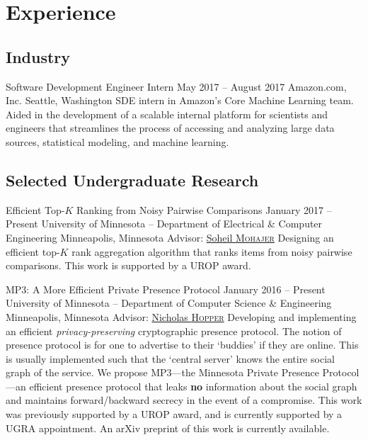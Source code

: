 \section{Experience}
\subsection{Industry}
\block
  {Software Development Engineer Intern}
  {May 2017 -- August 2017}
  {Amazon.com, Inc.}
  {Seattle, Washington}
  {}
  {
    SDE intern in Amazon's Core Machine Learning team. Aided in the development
    of a scalable internal platform for scientists and engineers that
    streamlines the process of accessing and analyzing large data sources,
    statistical modeling, and machine learning.
  }

\subsection{Selected Undergraduate Research}
\block
  {Efficient Top-\boldmath$K$ Ranking from Noisy Pairwise Comparisons}
  {January 2017 -- Present}
  {University of Minnesota -- Department of Electrical \& Computer Engineering}
  {Minneapolis, Minnesota}
  {Advisor: \href{\soheil}{Soheil \textsc{Mohajer}}}
  {
    Designing an efficient top-$K$ rank aggregation algorithm that ranks items
    from noisy pairwise comparisons.  This work is supported by a UROP award.
  }

\block
  {MP3: A More Efficient Private Presence Protocol}
  {January 2016 -- Present}
  {University of Minnesota -- Department of Computer Science \& Engineering}
  {Minneapolis, Minnesota}
  {Advisor: \href{\hoppernj}{Nicholas \textsc{Hopper}}}
  {
    Developing and implementing an efficient \emph{privacy-preserving}
    cryptographic presence protocol. The notion of presence protocol is for one
    to advertise to their `buddies' if they are online. This is usually
    implemented such that the `central server' knows the entire social graph of
    the service. We propose MP3---the Minnesota Private Presence Protocol---an
    efficient presence protocol that leaks \textbf{no} information about the
    social graph and maintains forward/backward secrecy in the event of a
    compromise.  This work was previously supported by a UROP award, and is
    currently supported by a UGRA appointment. An arXiv preprint of this work is
    currently available.
  }

